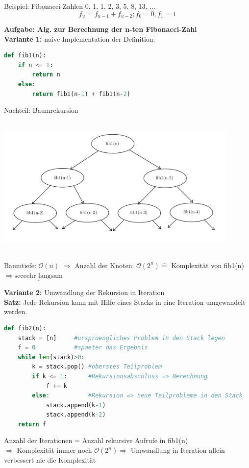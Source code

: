 \documentclass[11pt, fleqn]{scrreprt}
\begin{document}
Beispiel: Fibonacci-Zahlen
0, 1, 1, 2, 3, 5, 8, 13, ...\\
\[f_u = f_{u-1} + f_{u-2}; f_0 = 0, f_1 = 1\]

\textbf{Aufgabe: Alg. zur Berechnung der n-ten Fibonacci-Zahl}\\

\textbf{Variante 1:} naive Implementation der Definition:
\begin{lstlisting}[language=Python]
def fib1(n):
	if n <= 1:
		return n
	else:
		return fib1(n-1) + fib1(n-2)
\end{lstlisting}
Nachteil: Baumrekursion\\
\begin{center}
\includegraphics[width=12cm,height=7cm,keepaspectratio]{./Pictures/Fibonacci.png}
\end{center}

Baumtiefe: $\mathcal{O}(n)$ $\Rightarrow$ Anzahl der Knoten: $\mathcal{O}(2^n) \widehat{=}$ Komplexität von fib1(n) $\Rightarrow \underline{\text{seeeehr langsam}}$

\textbf{Variante 2:} Umwandlung der Rekursion in Iteration\\

\textbf{Satz:} Jede Rekursion kann mit Hilfe eines Stacks in eine Iteration umgewandelt werden.
\begin{lstlisting}[language=Python]
def fib2(n):
	stack = [n]     #urspruengliches Problem in den Stack legen
	f = 0           #spaeter das Ergebnis
	while len(stack)>0:
		k = stack.pop() #oberstes Teilproblem
		if k <= 1:      #Rekursionsabschluss => Berechnung
			f += k
		else:           #Rekursion => neue Teilprobleme in den Stack
			stack.append(k-1)
			stack.append(k-2)
	return f
\end{lstlisting}

Anzahl der Iterationen = Anzahl rekursive Aufrufe in fib1(n)\\
$\Rightarrow$ Komplexität immer noch $\mathcal{O}(2^n) \Rightarrow$ Umwandlung in Iteration allein verbessert nie die Komplexität\\
\end{document}
